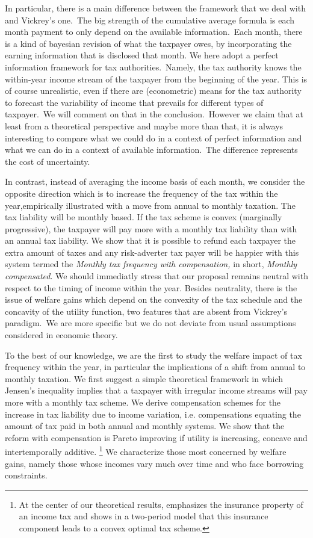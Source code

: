 In particular, there is a main difference between the framework that we deal
with and Vickrey's one.\ The big strength of the cumulative average formula is
each month payment to only depend on the available information.\ Each month,
there is a kind of bayesian revision of what the taxpayer owes, by
incorporating the earning information that is disclosed that month. We here
adopt a perfect information framework for tax authorities.\ Namely, the tax
authority knows the within-year income stream of the taxpayer from the
beginning of the year. This is of course unrealistic, even if there are
(econometric) means for the tax authority to forecast the variability of
income that prevails for different types of taxpayer.\ We will comment on that
in the conclusion.\ However we claim that at least from a theoretical
perspective and maybe more than that, it is always interesting to compare what
we could do in a context of perfect information and what we can do in a
context of available information.\ The difference represents the cost of uncertainty.\ 

In contrast, instead of averaging the income basis of each month, we consider
the opposite direction which is to increase the frequency of the tax within
the year,empirically illustrated with a move from annual to monthly taxation.
The tax liability will be monthly based. If the tax scheme is convex
(marginally progressive), the taxpayer will pay more with a monthly tax
liability than with an annual tax liability. We show that it is possible to
refund each taxpayer the extra amount of taxes and any risk-adverter tax payer
will be happier with this system termed the \textit{Monthly tax frequency with
compensation, }in short, \textit{Monthly compensated}. We should immediatly
stress that our proposal remains neutral with respect to the timing of income
within the year. Besides neutrality, there is the issue of welfare gains which
depend on the convexity of the tax schedule and the concavity of the utility
function, two features that are absent from Vickrey's paradigm.\ We are more
specific but we do not deviate from usual assumptions considered in economic theory.\ 

To the best of our knowledge, we are the first to study the welfare impact of
tax frequency within the year, in particular the implications of a shift from
annual to monthly taxation. We first suggest a simple theoretical framework in
which Jensen's inequality implies that a taxpayer with irregular income
streams will pay more with a monthly tax scheme. We derive compensation
schemes for the increase in tax liability due to income variation, i.e.
compensations equating the amount of tax paid in both annual and monthly
systems. We show that the reform with compensation is Pareto improving if
utility is increasing, concave and intertemporally additive. \footnote{At the
center of our theoretical results, \citet {varian1980redistributive}
emphasizes the insurance property of an income tax and shows in a two-period
model that this insurance component leads to a convex optimal tax scheme.} We
characterize those most concerned by welfare gains, namely those whose incomes
vary much over time and who face borrowing constraints.

